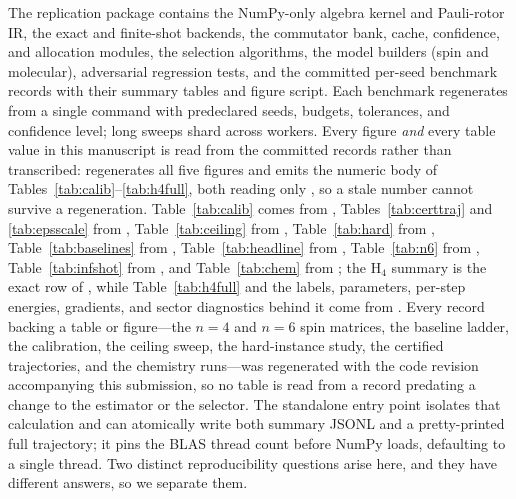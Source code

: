 \documentclass[aps,pra,reprint,superscriptaddress,nofootinbib,floatfix]{revtex4-2}
\begin{document}
The replication package contains the NumPy-only algebra kernel and Pauli-rotor IR, the exact and finite-shot backends, the commutator bank, cache, confidence, and allocation modules, the selection algorithms, the model builders (spin and molecular), adversarial regression tests, and the committed per-seed benchmark records with their summary tables and figure script. Each benchmark regenerates from a single command with predeclared seeds, budgets, tolerances, and confidence level; long sweeps shard across workers. Every figure \emph{and} every table value in this manuscript is read from the committed records rather than transcribed:  regenerates all five figures and  emits the numeric body of Tables~\ref{tab:calib}--\ref{tab:h4full}, both reading only , so a stale number cannot survive a regeneration. Table~\ref{tab:calib} comes from , Tables~\ref{tab:certtraj} and \ref{tab:epsscale} from , Table~\ref{tab:ceiling} from , Table~\ref{tab:hard} from , Table~\ref{tab:baselines} from , Table~\ref{tab:headline} from , Table~\ref{tab:n6} from , Table~\ref{tab:infshot} from , and Table~\ref{tab:chem} from ; the H$_4$ summary is the exact row of , while Table~\ref{tab:h4full} and the labels, parameters, per-step energies, gradients, and sector diagnostics behind it come from . Every record backing a table or figure---the $n=4$ and $n=6$ spin matrices, the baseline ladder, the calibration, the ceiling sweep, the hard-instance study, the certified trajectories, and the chemistry runs---was regenerated with the code revision accompanying this submission, so no table is read from a record predating a change to the estimator or the selector. The standalone  entry point isolates that calculation and can atomically write both summary JSONL and a pretty-printed full trajectory; it pins the BLAS thread count before NumPy loads, defaulting to a single thread. Two distinct reproducibility questions arise here, and they have different answers, so we separate them.
\end{document}
